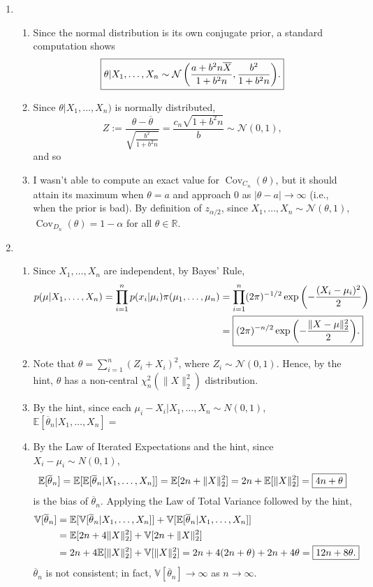 \documentclass[11pt]{article}
\newcommand{\E}{\mathbb{E}} %
\newcommand{\Var}{\mathbb{V}} %
\newcommand{\Cov}{\operatorname{Cov}} %
\newcommand{\R}{\mathbb{R}} %
\newcommand{\ol}{\overline}
\begin{document}
\begin{enumerate}
\item
\begin{enumerate}
\item Since the normal distribution is its own conjugate prior, a standard
computation shows
\[\mbox{\fbox{$\displaystyle
    \theta | X_1,\dots,X_n
        \sim \mathcal{N} \left(
            \frac{a + b^2n\ol X}{1 + b^2n},
            \frac{b^2}{1 + b^2n}
        \right)$.}}
\]
\item Since $\theta | X_1,\dots,X_n)$ is normally distributed,
\[Z
    := \frac{\theta - \ol \theta}{\sqrt{\frac{b^2}{1 + b^2n}}}
    = \frac{c_n\sqrt{1 + b^2n}}{b}
    \sim \mathcal{N}(0,1),
\]
and so 
\item I wasn't able to compute an exact value for $\Cov_{C_n}(\theta)$, but it
should attain its maximum when $\theta = a$ and approach $0$ as
$|\theta - a| \to \infty$ (i.e., when the prior is bad).
By definition of $z_{\alpha/2}$, since
$X_1,\dots,X_n \sim \mathcal{N}(\theta,1)$, $\Cov_{D_n}(\theta) = 1 - \alpha$
for all $\theta \in \R$.
\end{enumerate}
\item
\begin{enumerate}
\item Since $X_1,\dots,X_n$ are independent, by Bayes' Rule,
\begin{align*}
p(\mu | X_1,\dots,X_n)
    = \prod_{i = 1}^n p(x_i | \mu_i)\pi(\mu_1,\dots,\mu_n)
 &  = \prod_{i = 1}^n (2\pi)^{-1/2}\exp\left(-\frac{(X_i-\mu_i)^2}{2}\right)\\
 &  = \mbox{\fbox{$\displaystyle
        (2\pi)^{-n/2} \exp\left(-\frac{\|X - \mu\|_2^2}{2} \right)$.}}
\end{align*}
\item Note that $\theta = \sum_{i = 1}^n (Z_i + X_i)^2$, where
$Z_i \sim \mathcal{N}(0,1)$. Hence, by the hint, $\theta$ has a non-central
$\chi_n^2\left( \|X\|_2^2 \right)$ distribution.
\item By the hint, since each $\mu_i - X_i | X_1,\dots,X_n \sim N(0,1)$,
$\E[\ol \theta_n | X_1,\dots,X_n] =$ 
\item By the Law of Iterated Expectations and the hint, since
$X_i - \mu_i \sim N(0,1)$,
\[\E[\ol \theta_n]
    = \E[\E[\ol \theta_n | X_1,\dots,X_n]]
    = \E[2n + \|X\|_2^2]
    = 2n + \E[\|X\|_2^2]
    = \mbox{\fbox{$4n + \theta$}}
\]
is the bias of $\ol \theta_n$. Applying the Law of Total Variance followed by
the hint,
\begin{align*}
\Var[\ol \theta_n]
 &  = \E[\Var[\ol \theta_n | X_1,\dots,X_n]]
    + \Var[\E[\ol \theta_n | X_1,\dots,X_n]]    \\
 &  = \E[2n + 4\|X\|_2^2] + \Var[2n + \|X\|_2^2]    \\
 &  = 2n + 4\E[\|X\|_2^2] + \Var[\|X\|_2^2]
    = 2n + 4(2n + \theta) + 2n + 4\theta
    = \mbox{\fbox{$12n + 8\theta$.}}
\end{align*}
$\ol \theta_n$ is not consistent; in fact, $\Var[\ol \theta_n] \to \infty$ as
$n \to \infty$.
\end{enumerate}
\end{enumerate}
\end{document}
